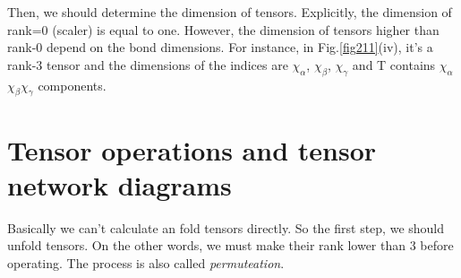 Then, we should determine the dimension of tensors. Explicitly, the dimension of rank=0 (scaler) is equal to one. However, the dimension of tensors higher than rank-0 depend on the bond dimensions. For instance, in Fig.\ref{fig211}(iv), it's a rank-3 tensor and the dimensions of the indices are $\chi_{\alpha}$, $\chi_{\beta}$, $\chi_{\gamma}$ and T contains $\chi_{\alpha}$$\chi_{\beta}$$\chi_{\gamma}$ components.

\section{Tensor operations and tensor network diagrams} %
\label{operation}
Basically we can't calculate an fold tensors directly. So the first step, we should unfold tensors. On the other words, we must make their rank lower than 3 before operating. The process is also called \textit{permuteation}.

